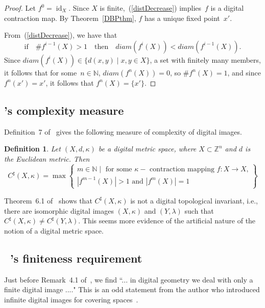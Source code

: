 \documentclass{article}
\newtheorem{definition}[thm]{Definition}
\numberwithin{thm}{section}
\DeclareMathOperator{\id}{id}
\def\Z{{\mathbb Z}}
\def\N{{\mathbb N}}
\begin{document}
\begin{proof}
    Let $f^0 = \id_X$.
    Since $X$ is finite,~(\ref{distDecrease})
    implies~$f$ is a digital contraction map. By
    Theorem~\ref{DBPthm},
    $f$ has a unique fixed point~$x'$.

From~(\ref{distDecrease}), we have that
    \[ \mbox{if }~~~ \#f^{i-1}(X) > 1
    ~~~\mbox{ then }~~~
    diam(f^i(X)) < diam(f^{i-1}(X)).
    \]
    Since $diam(f^i(X)) \in
    \{d(x,y) \mid x,y \in X \}$,
    a set with finitely many members, it follows that
    for some~$n \in \N$, $diam(f^n(X)) =0$, so
    $\#f^n(X) = 1$, and
since $f^n(x')=x'$, it follows that
    $f^n(X) = \{ x' \}$.
\end{proof}

\subsection{\cite{Han19}'s complexity measure}
Definition~7 of~\cite{Han19} gives the following measure of 
complexity of digital images. 
\begin{definition}
    \label{HanComplexity}
    {\rm \cite{Han19}}
    Let $(X,d,\kappa)$ be a digital metric space,
    where $X \subset \Z^n$ and $d$ is the 
    Euclidean metric. Then
    \[ C^{\sharp}(X,\kappa) =
    \max \left \{
    \begin{array}{l} m \in \N \mid \mbox{ for some $\kappa-$ contraction
       mapping }
    f: X \to X \mbox{,} \\
     |f^{m-1}(X)| > 1
       \mbox{ and } |f^m(X)| = 1
    \end {array} \right \}
    \]
\end{definition}

Theorem~6.1 of~\cite{Han19} shows that 
$C^{\sharp}(X,\kappa)$ is not a digital 
topological invariant, i.e., there are
isomorphic digital images
$(X,\kappa)$ and $(Y,\lambda)$ such that 
$C^{\sharp}(X,\kappa) \neq C^{\sharp}(Y,\lambda)$.
This seems more evidence of the artificial nature
of the notion of a digital metric space.


\subsection{~\cite{Han19}'s finiteness requirement}
Just before Remark~4.1 of~\cite{Han19}, we find
``... in digital geometry we deal with only a 
finite digital image ...." This is an odd statement
from the author who introduced infinite digital
images for covering spaces~\cite{HanNon}.
\end{document}
